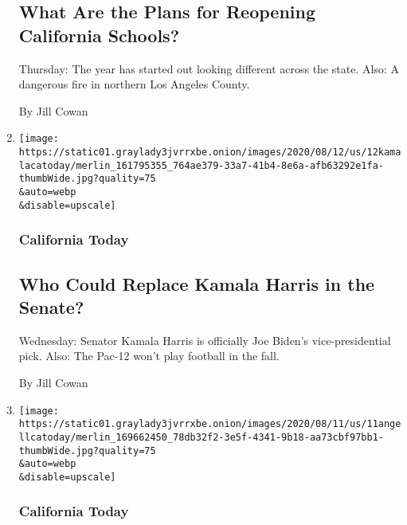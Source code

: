 \begin{enumerate}
  \hypertarget{what-are-the-plans-for-reopening-california-schools}{%
  \subsection{What Are the Plans for Reopening California
  Schools?}\label{what-are-the-plans-for-reopening-california-schools}}

  Thursday: The year has started out looking different across the state.
  Also: A dangerous fire in northern Los Angeles County.

  By Jill Cowan
\item
  \href{/2020/08/12/us/kamala-harris-vp-ca.html}{}

  \texttt{[image: https://static01.graylady3jvrrxbe.onion/images/2020/08/12/us/12kamalacatoday/merlin\_161795355\_764ae379-33a7-41b4-8e6a-afb63292e1fa-thumbWide.jpg?quality=75\\\&auto=webp\\\&disable=upscale]}

  \hypertarget{california-today-5}{%
  \subsubsection{California Today}\label{california-today-5}}

  \hypertarget{who-could-replace-kamala-harris-in-the-senate}{%
  \subsection{Who Could Replace Kamala Harris in the
  Senate?}\label{who-could-replace-kamala-harris-in-the-senate}}

  Wednesday: Senator Kamala Harris is officially Joe Biden's
  vice-presidential pick. Also: The Pac-12 won't play football in the
  fall.

  By Jill Cowan
\item
  \href{/2020/08/11/us/sonia-angell-ca-health-director-resigns.html}{}

  \texttt{[image: https://static01.graylady3jvrrxbe.onion/images/2020/08/11/us/11angellcatoday/merlin\_169662450\_78db32f2-3e5f-4341-9b18-aa73cbf97bb1-thumbWide.jpg?quality=75\\\&auto=webp\\\&disable=upscale]}

  \hypertarget{california-today-6}{%
  \subsubsection{California Today}\label{california-today-6}}

  \hypertarget{a-california-health-officials-abrupt-resignation}{%
}
\end{enumerate}
